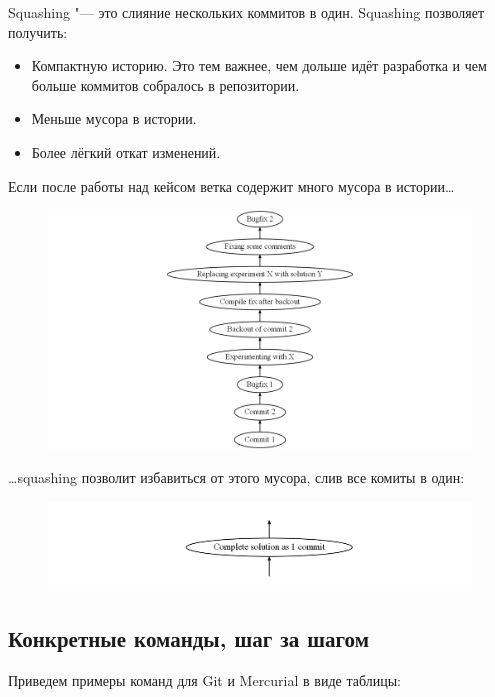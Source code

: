 \documentclass[10pt, a5paper]{article}
\begin{document}
Squashing "--- это слияние нескольких коммитов в один. Squashing позволяет получить:

\begin{itemize}
  \item Компактную историю. Это тем важнее, чем дольше идёт разработка и чем больше коммитов собралось в репозитории.
  \item Меньше мусора в истории.
  \item Более лёгкий откат изменений.
\end{itemize}

Если после работы над кейсом ветка содержит много мусора в истории\ldots{}
\begin{figure}[h!]
  \centering
  \includegraphics[scale=0.2]{02_2014_history-with-garbage.png}
\end{figure}

\ldots{}squashing позволит избавиться от этого мусора, слив все комиты в один:
\begin{figure}[h!]
  \centering
  \includegraphics[scale=0.3]{02_2014_history-without-garbage.png}
\end{figure}

\subsection*{Конкретные команды, шаг за шагом}

Приведем примеры команд для Git и Mercurial в виде таблицы:
\end{document}
